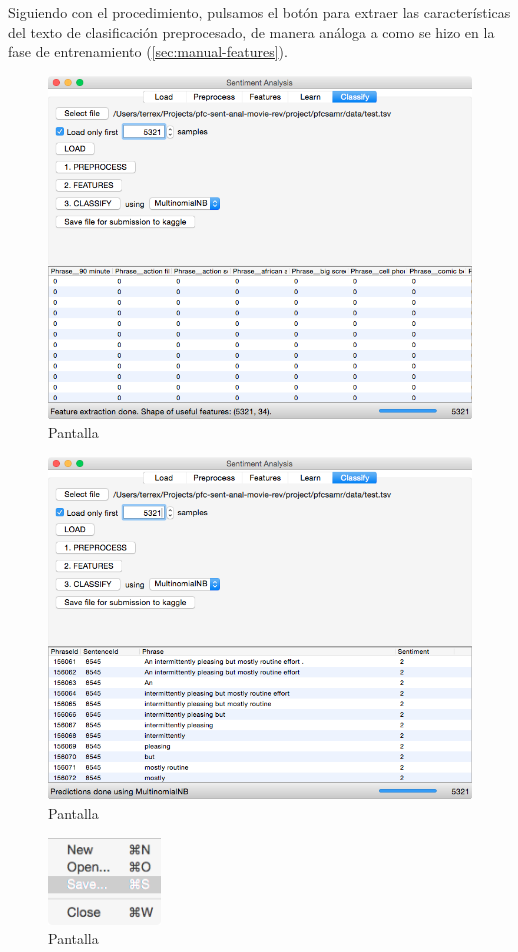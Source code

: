 Siguiendo con el procedimiento, pulsamos el botón  para extraer las características del texto de clasificación preprocesado, de manera análoga a como se hizo en la fase de entrenamiento (\autoref{sec:manual-features}).

\begin{figure}[H]
\centering
\includegraphics[width=12cm]{ss-10-classify-test-featured}
\caption{Pantalla }
\label{fig:ss-10-classify-test-featured}
\end{figure}

\begin{figure}[H]
\centering
\includegraphics[width=12cm]{ss-11-classify-test-predictions}
\caption{Pantalla }
\label{fig:ss-11-classify-test-predictions}
\end{figure}

\begin{figure}[H]
\centering
\includegraphics[width=3cm]{ss-12-menu-file}
\caption{Pantalla }
\label{fig:ss-12-menu-file}
\end{figure}

